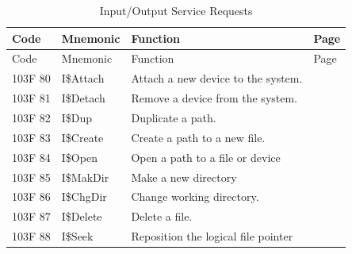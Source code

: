 \documentclass[
]{article}
\begin{document}
\begin{longtable}[]{@{}
  >{\raggedright\arraybackslash}p{}
  >{\raggedright\arraybackslash}p{}
  >{\raggedright\arraybackslash}p{}
  >{\raggedright\arraybackslash}p{}@{}}
\caption{Input/Output Service Requests}\tabularnewline
\toprule\noalign{}
\begin{minipage}[b]{\linewidth}\raggedright
Code
\end{minipage} & \begin{minipage}[b]{\linewidth}\raggedright
Mnemonic
\end{minipage} & \begin{minipage}[b]{\linewidth}\raggedright
Function
\end{minipage} & \begin{minipage}[b]{\linewidth}\raggedright
Page
\end{minipage} \\
\midrule\noalign{}
\endfirsthead
\toprule\noalign{}
\begin{minipage}[b]{\linewidth}\raggedright
Code
\end{minipage} & \begin{minipage}[b]{\linewidth}\raggedright
Mnemonic
\end{minipage} & \begin{minipage}[b]{\linewidth}\raggedright
Function
\end{minipage} & \begin{minipage}[b]{\linewidth}\raggedright
Page
\end{minipage} \\
\midrule\noalign{}
\endhead
\bottomrule\noalign{}
\endlastfoot
103F 80 & I\$Attach & Attach a new device to the system. & \\
103F 81 & I\$Detach & Remove a device from the system. & \\
103F 82 & I\$Dup & Duplicate a path. & \\
103F 83 & I\$Create & Create a path to a new file. & \\
103F 84 & I\$Open & Open a path to a file or device & \\
103F 85 & I\$MakDir & Make a new directory & \\
103F 86 & I\$ChgDir & Change working directory. & \\
103F 87 & I\$Delete & Delete a file. & \\
103F 88 & I\$Seek & Reposition the logical file pointer & \\

\end{longtable}
\end{document}
